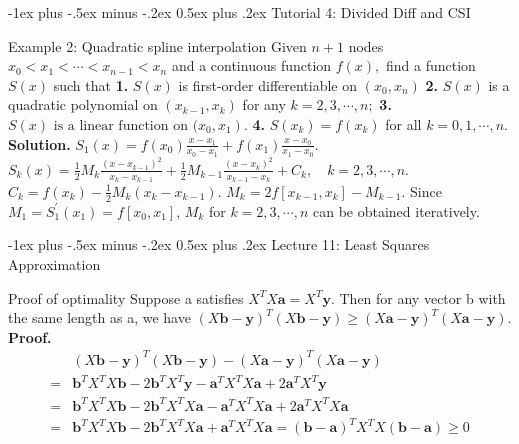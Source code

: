 \documentclass[10pt,landscape]{article}
\makeatletter
\renewcommand{\section}{\@startsection{section}{1}{0mm}%
                                {-1ex plus -.5ex minus -.2ex}%
                                {0.5ex plus .2ex}%
                                {\normalfont\large\bfseries}}
\theoremstyle{definition}
\newcommand{\thistheoremname}{}
\newtheorem*{genericthm*}{\thistheoremname}
\newenvironment{namedthm*}[1]
{\renewcommand{\thistheoremname}{#1}\begin{genericthm*}}
{\end{genericthm*}}
\makeatother
\begin{document}
\begin{multicols}{3}
	\section{Tutorial 4: Divided Diff and CSI}
	\begin{namedthm*}{Example 2: Quadratic spline interpolation}
		Given \(n+1\) nodes \(x_{0}<x_{1}<\cdots<x_{n-1}<x_{n}\) and a continuous function \(f(x),\)
		find a function \(S(x)\) such that
		\textbf{1.} \(S(x)\) is first-order differentiable on \(\left(x_{0}, x_{n}\right)\)
		\textbf{2.} \(S(x)\) is a quadratic polynomial on \(\left(x_{k-1}, x_{k}\right)\) for any \(k=2,3, \cdots, n ;\)
		\textbf{3.} \(\left.S(x) \text { is a linear function on (} x_{0}, x_{1}\right)\). \textbf{4.} \(S\left(x_{k}\right)=f\left(x_{k}\right)\) for all \(k=0,1, \cdots, n\).
		\\\textbf{Solution.} \(S_{1}(x)=f\left(x_{0}\right) \frac{x-x_{1}}{x_{0}-x_{1}}+f\left(x_{1}\right) \frac{x-x_{0}}{x_{1}-x_{0}}\). \(S_{k}(x)=\frac{1}{2} M_{k} \frac{\left(x-x_{k-1}\right)^{2}}{x_{k}-x_{k-1}}+\frac{1}{2} M_{k-1} \frac{\left(x-x_{k}\right)^{2}}{x_{k-1}-x_{k}}+C_{k}, \quad k=2,3, \cdots, n.\)\\\(C_{k}=f\left(x_{k}\right)-\frac{1}{2} M_{k}\left(x_{k}-x_{k-1}\right)\). \(M_{k}=2 f\left[x_{k-1}, x_{k}\right]-M_{k-1}\). Since \(M_{1}=S_{1}^{\prime}\left(x_{1}\right)=f\left[x_{0}, x_{1}\right]\), \(M_{k}\) for \(k=2,3, \cdots, n\) can be obtained iteratively.
	\end{namedthm*}
	\section{Lecture 11: Least Squares Approximation}
	\begin{namedthm*}{Proof of optimality}
		Suppose a satisfies \(
		X^{T} X \mathbf{a}=X^{T} \mathbf{y}.\) Then for any vector b with the same length as a, we have
		\(
		(X \mathbf{b}-\mathbf{y})^{T}(X \mathbf{b}-\mathbf{y}) \geqslant(X \mathbf{a}-\mathbf{y})^{T}(X \mathbf{a}-\mathbf{y})\). \textbf{Proof.}\[
		\begin{aligned}&(X \mathbf{b}-\mathbf{y})^{T}(X \mathbf{b}-\mathbf{y})-(X \mathbf{a}-\mathbf{y})^{T}(X \mathbf{a}-\mathbf{y}) \\=& \mathbf{b}^{T} X^{T} X \mathbf{b}-2 \mathbf{b}^{T} X^{T} \mathbf{y}-\mathbf{a}^{T} X^{T} X \mathbf{a}+2 \mathbf{a}^{T} X^{T} \mathbf{y} \\=& \mathbf{b}^{T} X^{T} X \mathbf{b}-2 \mathbf{b}^{T} X^{T} X \mathbf{a}-\mathbf{a}^{T} X^{T} X \mathbf{a}+2 \mathbf{a}^{T} X^{T} X \mathbf{a} \\=& \mathbf{b}^{T} X^{T} X \mathbf{b}-2 \mathbf{b}^{T} X^{T} X \mathbf{a}+\mathbf{a}^{T} X^{T} X \mathbf{a}=(\mathbf{b}-\mathbf{a})^{T} X^{T} X(\mathbf{b}-\mathbf{a}) \geqslant 0 \end{aligned}
		\]


\end{namedthm*}
\end{multicols}
\end{document}
